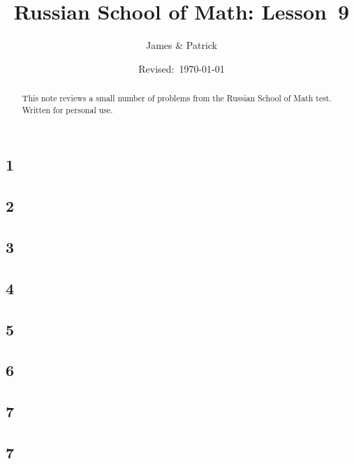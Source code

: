 \documentclass[12pt]{article}
\title{Russian School of Math: Lesson~9}
\author{James \& Patrick}
\date{Revised:~\today}
\begin{document}
\maketitle
\begin{abstract}\setlength{\parindent}{0pt}%
This note reviews a small number of problems from the Russian School of Math test. Written for personal use.
\end{abstract}

\thispagestyle{empty}
\clearpage

\subsection*{1}

\begin{solution}
  
\end{solution}

\subsection*{2}

\begin{solution}
  
\end{solution}

\subsection*{3}

\begin{solution}
  
\end{solution}

\subsection*{4}

\begin{solution}
  
\end{solution}

\subsection*{5}

\begin{solution}
  
\end{solution}

\subsection*{6}

\begin{solution}
  
\end{solution}

\subsection*{7}

\begin{solution}
  
\end{solution}

\subsection*{7}

\begin{solution}
  
\end{solution}
\end{document}
